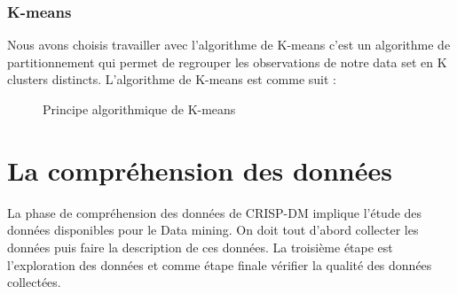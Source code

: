 \documentclass{article}
\begin{document}
                \subsubsection{K-means}
                    Nous avons  choisis travailler avec l’algorithme de K-means c’est un algorithme de partitionnement qui permet de regrouper les observations de notre data set en K clusters distincts. L’algorithme de K-means est comme suit :\\
                    \begin{figure}[h!]
                        \centering
                        \caption{Principe algorithmique de K-means}
                        \label{fig:1}
                    \end{figure}
    \newpage
        \section{La compréhension des données}
            La phase de compréhension des données de CRISP-DM implique l’étude des données disponibles pour le Data mining. On doit tout d’abord collecter les données puis faire la description de ces données. La troisième étape est l’exploration des données et comme étape finale vérifier la qualité des données collectées.\\
\end{document}

